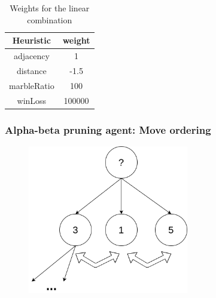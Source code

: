 \documentclass{beamer}
\begin{document}
\begin{frame}
	\begin{table}
		\begin{center}
			\begin{tabular}{ | c | c | }
				\hline
				Heuristic   & weight \\
				\hline
				adjacency   & 1      \\
				\hline
				distance    & -1.5   \\
				\hline
				marbleRatio & 100    \\
				\hline
				winLoss     & 100000 \\
				\hline
			\end{tabular}
		\end{center}
		\caption{Weights for the linear combination}
		\label{heuristic_table}
	\end{table}
\end{frame}

\begin{frame}
	\frametitle{Alpha-beta pruning agent: Move ordering}
	\begin{figure}
		\centering
		\includegraphics[width=7cm, keepaspectratio]{move_ordering.png}
	\end{figure}
\end{frame}
\end{document}
